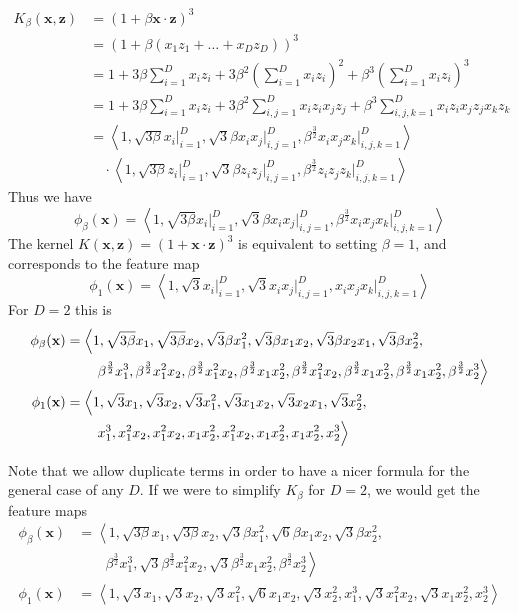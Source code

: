 \documentclass[12pt]{article}
\begin{document}
\begin{align*}
        K_\beta(\mathbf{x},\mathbf{z})&=(1+\beta\mathbf{x}\cdot\mathbf{z})^3\\
        &=(1+\beta(x_1z_1+\ldots+x_Dz_D))^3\\
        &=1+3\beta\sum_{i=1}^Dx_iz_i+3\beta^2\left(\sum_{i=1}^Dx_iz_i\right)^2+\beta^3\left(\sum_{i=1}^Dx_iz_i\right)^3\\
        &=1+3\beta\sum_{i=1}^Dx_iz_i+3\beta^2\sum_{i,j=1}^Dx_iz_ix_jz_j+\beta^3\sum_{i,j,k=1}^Dx_iz_ix_jz_jx_kz_k\\
        &=\left<1,\sqrt{3\beta}x_i\Big|_{i=1}^D,\sqrt{3}\beta x_ix_j\Big|_{i,j=1}^D,\beta^\frac{3}{2} x_ix_jx_k\Big|_{i,j,k=1}^D\right>\\
        &\quad\cdot\left<1,\sqrt{3\beta}z_i\Big|_{i=1}^D,\sqrt{3}\beta z_iz_j\Big|_{i,j=1}^D,\beta^\frac{3}{2} z_iz_jz_k\Big|_{i,j,k=1}^D\right>
\end{align*}
Thus we have
\[\phi_\beta(\mathbf{x})=\left<1,\sqrt{3\beta}x_i\Big|_{i=1}^D,\sqrt{3}\beta x_ix_j\Big|_{i,j=1}^D,\beta^\frac{3}{2} x_ix_jx_k\Big|_{i,j,k=1}^D\right>\]
The kernel \(K(\mathbf{x},\mathbf{z})=(1+\mathbf{x}\cdot\mathbf{z})^3\) is equivalent to setting \(\beta=1\), and corresponds to the feature map
\[\phi_1(\mathbf{x})=\left<1,\sqrt{3}x_i\Big|_{i=1}^D,\sqrt{3} x_ix_j\Big|_{i,j=1}^D,x_ix_jx_k\Big|_{i,j,k=1}^D\right>\]
For \(D=2\) this is
\begin{align*}
        \phi_\beta(\mathbf{x})&=\left<1,\sqrt{3\beta}x_1,\sqrt{3\beta}x_2,\sqrt{3}\beta x_1^2,\sqrt{3}\beta x_1x_2,\sqrt{3}\beta x_2x_1,\sqrt{3}\beta x_2^2,\right.\\
        &\left.\qquad\beta^\frac{3}{2}x_1^3,\beta^\frac{3}{2}x_1^2x_2,\beta^\frac{3}{2}x_1^2x_2,\beta^\frac{3}{2}x_1x_2^2,
        \beta^\frac{3}{2}x_1^2x_2,\beta^\frac{3}{2}x_1x_2^2,\beta^\frac{3}{2}x_1x_2^2,\beta^\frac{3}{2}x_2^3\right>\\
        \phi_1(\mathbf{x})&=\left<1,\sqrt{3}x_1,\sqrt{3}x_2,\sqrt{3}x_1^2,\sqrt{3} x_1x_2,\sqrt{3}x_2x_1,\sqrt{3}x_2^2,\right.\\
        &\left.\qquad\vphantom{\sqrt{1}}x_1^3,x_1^2x_2,x_1^2x_2,x_1x_2^2,x_1^2x_2,x_1x_2^2,x_1x_2^2,x_2^3\right>
\end{align*}

Note that we allow duplicate terms in order to have a nicer formula for the general case of any \(D\). If we were to simplify \(K_\beta\) for \(D=2\), we would get
the feature maps
\begin{align*}
        \phi_\beta(\mathbf{x})&=\left<1,\sqrt{3\beta}x_1,\sqrt{3\beta}x_2,\sqrt{3}\beta x_1^2,\sqrt{6}\beta x_1x_2,\sqrt{3}\beta x_2^2,\right.\\
        &\left.\qquad\beta^\frac{3}{2}x_1^3,\sqrt{3}\beta^\frac{3}{2}x_1^2x_2,\sqrt{3}\beta^\frac{3}{2}x_1x_2^2,\beta^\frac{3}{2}x_2^3\right>\\
        \phi_1(\mathbf{x})&=\left<1,\sqrt{3}x_1,\sqrt{3}x_2,\sqrt{3}x_1^2,\sqrt{6}x_1x_2,\sqrt{3}x_2^2,x_1^3,\sqrt{3}x_1^2x_2,\sqrt{3}x_1x_2^2,x_2^3\right>
\end{align*}
\end{document}
